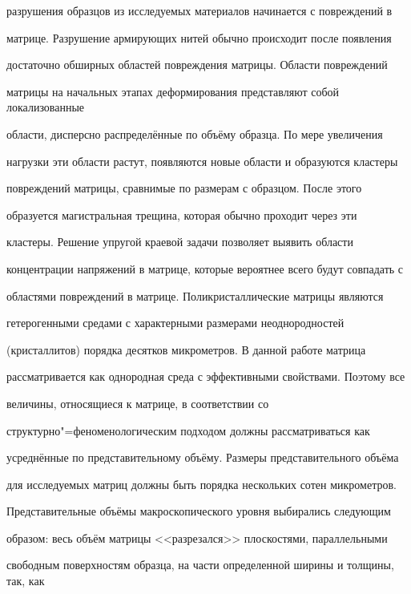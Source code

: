 разрушения образцов из исследуемых материалов начинается с повреждений в

матрице. Разрушение армирующих нитей обычно происходит после появления

достаточно обширных областей повреждения матрицы. Области повреждений

матрицы на начальных этапах деформирования представляют собой локализованные

области, дисперсно распределённые по объёму образца. По мере увеличения

нагрузки эти области растут, появляются новые области и образуются кластеры

повреждений матрицы, сравнимые по размерам с образцом. После этого

образуется магистральная трещина, которая обычно проходит через эти

кластеры. Решение упругой краевой задачи позволяет выявить области

концентрации напряжений в матрице, которые вероятнее всего будут совпадать с

областями повреждений в матрице. Поликристаллические матрицы являются

гетерогенными средами с характерными размерами неоднородностей

(кристаллитов) порядка десятков микрометров. В данной работе матрица

рассматривается как однородная среда с эффективными свойствами. Поэтому все

величины, относящиеся к матрице, в соответствии со

структурно"=феноменологическим подходом \cite{osheva:bib5} должны рассматриваться как

усреднённые по представительному объёму. Размеры представительного объёма

для исследуемых матриц должны быть порядка нескольких сотен микрометров.









Представительные объёмы макроскопического уровня выбирались следующим

образом: весь объём матрицы <<разрезался>> плоскостями, параллельными

свободным поверхностям образца, на части определенной ширины и толщины, так, как\linebreak \pagebreak



